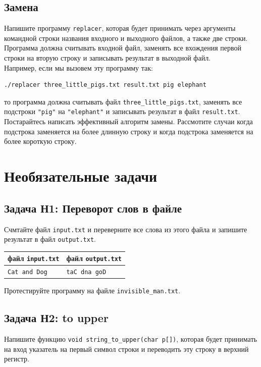 \documentclass{article}
\begin{document}
\subsection{Замена}
Напишите программу \texttt{replacer}, которая будет принимать через аргументы командной строки названия входного и выходного файлов, а также две строки. Программа должна считывать входной файл, заменять все вхождения первой строки на вторую строку и записывать результат в выходной файл.\\
Например, если мы вызовем эту программу так:
\begin{verbatim}
./replacer three_little_pigs.txt result.txt pig elephant
\end{verbatim}
то программа должна считывать файл \texttt{three\_little\_pigs.txt}, заменять все подстроки \texttt{"pig"} на \texttt{"elephant"} и записывать результат в файл \texttt{result.txt}. Постарайтесь написать эффективный алгоритм замены. Рассмотите случаи когда подстрока заменяется на более длинную строку и когда подстрока заменяется на более короткую строку.


\newpage
\section*{Необязательные задачи}
\subsection*{Задача Н1: Переворот слов в файле}
Счмтайте файл \texttt{input.txt}  и переверните все слова из этого файла и запишите результат в файл \texttt{output.txt}.
\begin{center} 
\begin{tabular}{ l | l }
 файл \texttt{input.txt} & файл \texttt{output.txt} \\ \hline
 \texttt{Cat and Dog} & \texttt{taC dna goD}\\
\end{tabular}
\end{center}
Протестируйте программу на файле \texttt{invisible\_man.txt}.


\subsection*{Задача Н2: to upper}
Напишите функцию \texttt{void string\_to\_upper(char p[])}, которая будет принимать на вход указатель на первый символ строки и переводить эту строку в верхний регистр.
\end{document}
